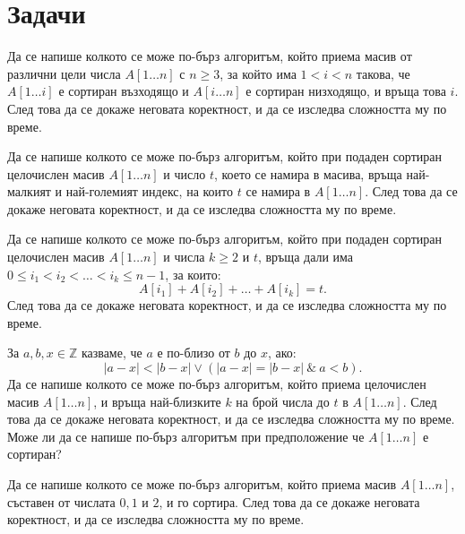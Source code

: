 \section{Задачи}

\begin{problem}
Да се напише колкото се може по-бърз алгоритъм, който приема масив от различни цели числа $A[1 \dots n]$ с $n \geq 3$, за който има $1 < i < n$ такова, че $A[1 \dots i]$ е сортиран възходящо и $A[i \dots n]$ е сортиран низходящо, и връща това $i$.
След това да се докаже неговата коректност, и да се изследва сложността му по време.
\end{problem}

\begin{problem}
Да се напише колкото се може по-бърз алгоритъм, който при подаден сортиран целочислен масив $A[1 \dots n]$ и число $t$, което се намира в масива, връща най-малкият и най-големият индекс, на които $t$ се намира в $A[1 \dots n]$.
След това да се докаже неговата коректност, и да се изследва сложността му по време.
\end{problem}

\begin{problem}
Да се напише колкото се може по-бърз алгоритъм, който при подаден сортиран целочислен масив $A[1 \dots n]$ и числа $k \geq 2$ и $t$, връща дали има $0 \leq i_1 < i_2 < \dots < i_k \leq n - 1$, за които:
\[
    A[i_1] + A[i_2] + \dots + A[i_k] = t.
\]
След това да се докаже неговата коректност, и да се изследва сложността му по време.
\end{problem}

\begin{problem}
За $a, b, x \in \mathbb{Z}$ казваме, че $a$ е по-близо от $b$ до $x$, ако:
\[
    |a - x| < |b - x| \lor (|a - x| = |b - x| \: \& \: a < b).
\]
Да се напише колкото се може по-бърз алгоритъм, който приема целочислен масив $A[1 \dots n]$, и връща най-близките $k$ на брой числа до $t$ в $A[1 \dots n]$.
След това да се докаже неговата коректност, и да се изследва сложността му по време.
Може ли да се напише по-бърз алгоритъм при предположение че $A[1 \dots n]$ е сортиран?
\end{problem}

\begin{problem}
Да се напише колкото се може по-бърз алгоритъм, който приема масив $A[1 \dots n]$, съставен от числата $0, 1$ и $2$, и го сортира.
След това да се докаже неговата коректност, и да се изследва сложността му по време.
\end{problem}

